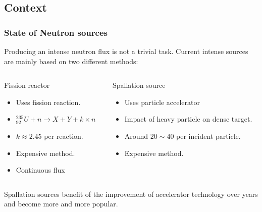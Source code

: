 \subsection{Context}
\begin{frame}
  \frametitle{State of Neutron sources}
  Producing an intense neutron flux is not a trivial task.
  Current intense sources are mainly based on two different methods:
  \begin{columns}[T]
    \begin{column}{0.45\textwidth}
      \begin{block}{Fission reactor}
        \begin{itemize}
          \item Uses fission reaction.
          \item $_{92}^{235}U + n \rightarrow X + Y + k \times n$
          \item $k\approx2.45$ per reaction.
          \item Expensive method.
          \item Continuous flux
        \end{itemize}    
      \end{block}
      \vfill
    \end{column}
    \begin{column}{0.45\textwidth}
      \begin{block}{Spallation source}
        \begin{itemize}
          \item Uses particle accelerator
          \item Impact of heavy particle on dense target.
          \item Around $20 \sim 40$ per incident particle.
          \item Expensive method.
        \end{itemize}        
      \end{block}
      \vfill
    \end{column}
  \end{columns}
  Spallation sources benefit of the improvement of accelerator technology over years and become more and more popular.
\end{frame}

